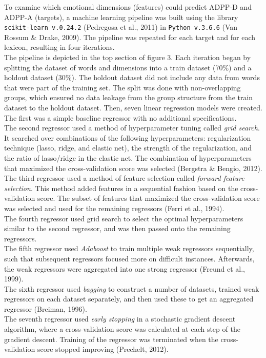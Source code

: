 \documentclass[11pt, a4paper]{article}
\begin{document}
To examine which emotional dimensions (features) could predict ADPP-D and ADPP-A (targets), a machine learning pipeline was built using the library \texttt{scikit-learn v.0.24.2} (Pedregosa et al., 2011) in \texttt{Python v.3.6.6} (Van Rossum \& Drake, 2009). The pipeline was repeated for each target and for each lexicon, resulting in four iterations.\\ 
The pipeline is depicted in the top section of figure 3. Each iteration began by splitting the dataset of words and dimensions into a train dataset (70\%) and a holdout dataset (30\%). The holdout dataset did not include any data from words that were part of the training set. The split was done with non-overlapping groups, which ensured no data leakage from the group structure from the train dataset to the holdout dataset. Then, seven linear regression models were created.\\
The first was a simple baseline regressor with no additional specifications.\\
The second regressor used a method of hyperparameter tuning called \textit{grid search}. It searched over combinations of the following hyperparameters: regularization technique (lasso, ridge, and elastic net), the strength of the regularization, and the ratio of lasso/ridge in the elastic net. The combination of hyperparameters that maximized the cross-validation score was selected (Bergstra \& Bengio, 2012).\\
The third regressor used a method of feature selection called \textit{forward feature selection}. This method added features in a sequential fashion based on the cross-validation score. The subset of features that maximized the cross-validation score was selected and used for the remaining regressors (Ferri et al., 1994). \\
The fourth regressor used grid search to select the optimal hyperparameters similar to the second regressor, and was then passed onto the remaining regressors. \\
The fifth regressor used \textit{Adaboost} to train multiple weak regressors sequentially, such that subsequent regressors focused more on difficult instances. Afterwards, the weak regressors were aggregated into one strong regressor (Freund et al., 1999).\\
The sixth regressor used \textit{bagging} to construct a number of datasets, trained weak regressors on each dataset separately, and then used these to get an aggregated regressor (Breiman, 1996). \\
The seventh regressor used \textit{early stopping} in a stochastic gradient descent algorithm, where a cross-validation score was calculated at each step of the gradient descent. Training of the regressor was terminated when the cross-validation score stopped improving (Prechelt, 2012).
\end{document}
